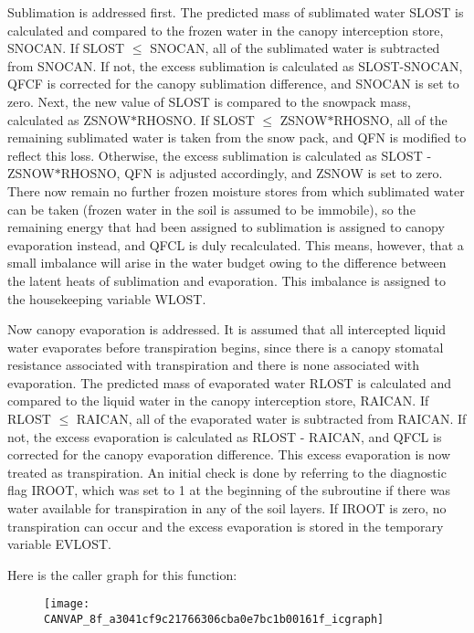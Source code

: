 Sublimation is addressed first. The predicted mass of sublimated water S\+L\+O\+S\+T is calculated and compared to the frozen water in the canopy interception store, S\+N\+O\+C\+A\+N. If S\+L\+O\+S\+T $\leq$ S\+N\+O\+C\+A\+N, all of the sublimated water is subtracted from S\+N\+O\+C\+A\+N. If not, the excess sublimation is calculated as S\+L\+O\+S\+T-\/\+S\+N\+O\+C\+A\+N, Q\+F\+C\+F is corrected for the canopy sublimation difference, and S\+N\+O\+C\+A\+N is set to zero. Next, the new value of S\+L\+O\+S\+T is compared to the snowpack mass, calculated as Z\+S\+N\+O\+W$\ast$\+R\+H\+O\+S\+N\+O. If S\+L\+O\+S\+T $\leq$ Z\+S\+N\+O\+W$\ast$\+R\+H\+O\+S\+N\+O, all of the remaining sublimated water is taken from the snow pack, and Q\+F\+N is modified to reflect this loss. Otherwise, the excess sublimation is calculated as S\+L\+O\+S\+T -\/ Z\+S\+N\+O\+W$\ast$\+R\+H\+O\+S\+N\+O, Q\+F\+N is adjusted accordingly, and Z\+S\+N\+O\+W is set to zero. There now remain no further frozen moisture stores from which sublimated water can be taken (frozen water in the soil is assumed to be immobile), so the remaining energy that had been assigned to sublimation is assigned to canopy evaporation instead, and Q\+F\+C\+L is duly recalculated. This means, however, that a small imbalance will arise in the water budget owing to the difference between the latent heats of sublimation and evaporation. This imbalance is assigned to the housekeeping variable W\+L\+O\+S\+T.

Now canopy evaporation is addressed. It is assumed that all intercepted liquid water evaporates before transpiration begins, since there is a canopy stomatal resistance associated with transpiration and there is none associated with evaporation. The predicted mass of evaporated water R\+L\+O\+S\+T is calculated and compared to the liquid water in the canopy interception store, R\+A\+I\+C\+A\+N. If R\+L\+O\+S\+T $\leq$ R\+A\+I\+C\+A\+N, all of the evaporated water is subtracted from R\+A\+I\+C\+A\+N. If not, the excess evaporation is calculated as R\+L\+O\+S\+T -\/ R\+A\+I\+C\+A\+N, and Q\+F\+C\+L is corrected for the canopy evaporation difference. This excess evaporation is now treated as transpiration. An initial check is done by referring to the diagnostic flag I\+R\+O\+O\+T, which was set to 1 at the beginning of the subroutine if there was water available for transpiration in any of the soil layers. If I\+R\+O\+O\+T is zero, no transpiration can occur and the excess evaporation is stored in the temporary variable E\+V\+L\+O\+S\+T. 

Here is the caller graph for this function\+:\nopagebreak
\begin{figure}[H]
\begin{center}
\leavevmode
\texttt{[image: CANVAP\_8f\_a3041cf9c21766306cba0e7bc1b00161f\_icgraph]}
\end{center}
\end{figure}


